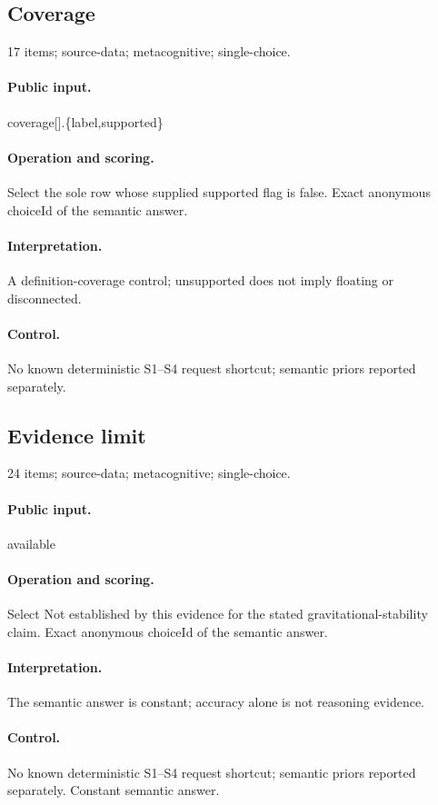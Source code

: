 \subsection{Coverage}
17 items; source-data; metacognitive; single-choice.
\paragraph{Public input.}coverage[].\{label,supported\}
\paragraph{Operation and scoring.}Select the sole row whose supplied supported flag is false. Exact anonymous choiceId of the semantic answer.
\paragraph{Interpretation.}A definition-coverage control; unsupported does not imply floating or disconnected.
\paragraph{Control.}No known deterministic S1--S4 request shortcut; semantic priors reported separately.
\subsection{Evidence limit}
24 items; source-data; metacognitive; single-choice.
\paragraph{Public input.}available
\paragraph{Operation and scoring.}Select Not established by this evidence for the stated gravitational-stability claim. Exact anonymous choiceId of the semantic answer.
\paragraph{Interpretation.}The semantic answer is constant; accuracy alone is not reasoning evidence.
\paragraph{Control.}No known deterministic S1--S4 request shortcut; semantic priors reported separately. Constant semantic answer.
